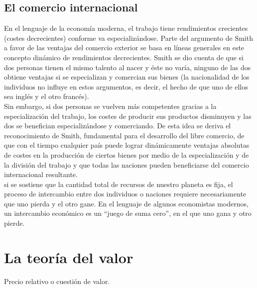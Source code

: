 \documentclass[10pt]{book}
\begin{document}
\subsection*{El comercio internacional}
En el lenguaje de la economía moderna, el trabajo tiene rendimientos crecientes (costes decrecientes) conforme va especializándose. Parte del argumento de Smith a favor de las ventajas del comercio exterior se basa en líneas generales en este concepto dinámico de rendimientos decrecientes. Smith se dio cuenta de que si dos personas tienen el mismo talento al nacer y éste no varía, ninguno de las dos obtiene ventajas si se especializan y comercian sus bienes (la nacionalidad de los individuos no influye en estos argumentos, es decir, el hecho de que uno de ellos sea inglés y el otro francés).\\
Sin embargo, si dos personas se vuelven más competentes gracias a la especialización del trabajo, los costes de producir sus productos disminuyen y las dos se benefician especializándose y comerciando. De esta idea se deriva el reconocimiento de Smith, fundamental para el desarrollo del libre comercio, de que con el tiempo cualquier país puede lograr dinámicamente ventajas absolutas de costes en la producción de ciertos bienes por medio de la especialización y de la división del trabajo y que todas las naciones pueden beneficiarse del comercio internacional resultante.\\
si se sostiene que la cantidad total de recursos de nuestro planeta es fija, el proceso de intercambio entre dos individuos o naciones requiere necesariamente que uno pierda y el otro gane. En el lenguaje de algunos economistas modernos, un intercambio económico es un “juego de suma cero”, en el que uno gana y otro pierde.\\

\section*{La teoría del valor}
Precio relativo o cuestión de valor.
\end{document}

